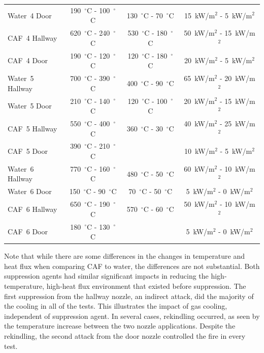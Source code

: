 \documentclass[12pt,oneside]{book}
\begin{document}
\begin{table}[!ht]
\begin{tabular}{lccc}
Water~4 Door     & 190~$^{\circ}$C - 100~$^{\circ}$C   & 130~$^{\circ}$C - 70~$^{\circ}$C    & 15~kW/m$^2$ - 5~kW/m$^2$  \\ [.25cm]
CAF~4 Hallway    & 620~$^{\circ}$C - 240~$^{\circ}$C   & 530~$^{\circ}$C - 180~$^{\circ}$C   & 50~kW/m$^2$ - 15~kW/m$^2$  \\
CAF~4 Door       & 190~$^{\circ}$C - 120~$^{\circ}$C   & 120~$^{\circ}$C - 180~$^{\circ}$C   & 20~kW/m$^2$ - 5~kW/m$^2$  \\ [.25cm]
Water~5 Hallway  & 700~$^{\circ}$C - 390~$^{\circ}$C   & 400~$^{\circ}$C - 90~$^{\circ}$C    & 65~kW/m$^2$ - 20~kW/m$^2$  \\
Water~5 Door     & 210~$^{\circ}$C - 140~$^{\circ}$C   & 120~$^{\circ}$C - 100~$^{\circ}$C   & 20~kW/m$^2$ - 15~kW/m$^2$  \\ [.25cm]
CAF~5 Hallway    & 550~$^{\circ}$C - 400~$^{\circ}$C   & 360~$^{\circ}$C - 30~$^{\circ}$C    & 40~kW/m$^2$ - 25~kW/m$^2$  \\
CAF~5 Door       & 390~$^{\circ}$C - 210~$^{\circ}$C   &                                     & 10~kW/m$^2$ - 5~kW/m$^2$  \\ [.25cm]
Water~6 Hallway  & 770~$^{\circ}$C - 160~$^{\circ}$C   & 480~$^{\circ}$C - 50~$^{\circ}$C    & 60~kW/m$^2$ - 10~kW/m$^2$  \\
Water~6 Door     & 150~$^{\circ}$C - 90~$^{\circ}$C    & 70~$^{\circ}$C - 50~$^{\circ}$C     & 5~kW/m$^2$ - 0~kW/m$^2$  \\ [.25cm]
CAF~6 Hallway    & 650~$^{\circ}$C - 190~$^{\circ}$C   & 570~$^{\circ}$C - 60~$^{\circ}$C    & 50~kW/m$^2$ - 10~kW/m$^2$  \\
CAF~6 Door       & 180~$^{\circ}$C - 130~$^{\circ}$C   &                                     & 5~kW/m$^2$ - 0~kW/m$^2$  \\ [.25cm]
\bottomrule[1.25pt]
\end{tabular}\par
\end{table}

Note that while there are some differences in the changes in temperature and heat flux when comparing CAF to water, the differences are not substantial. Both suppression agents had similar significant impacts in reducing the high-temperature, high-heat flux environment that existed before suppression. The first suppression from the hallway nozzle, an indirect attack, did the majority of the cooling in all of the tests. This illustrates the impact of gas cooling, independent of suppression agent. In several cases, rekindling occurred, as seen by the temperature increase between the two nozzle applications. Despite the rekindling, the second attack from the door nozzle controlled the fire in every test.
\end{document}

